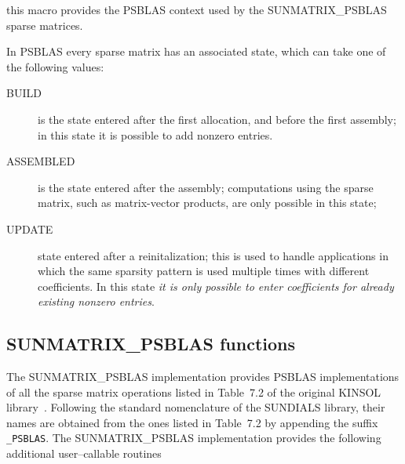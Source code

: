 \documentclass[twoside,a4paper]{refart}
\begin{document}
 this macro provides the PSBLAS context used by the SUNMATRIX\_PSBLAS sparse matrices.

In PSBLAS every sparse matrix has an associated state, which can take one of the following
values:
\begin{description}
\item[BUILD] is the state entered after the first allocation, and before the first assembly; in
this state it is possible to add nonzero entries.
\item[ASSEMBLED] is the state entered after the assembly; computations using the sparse
matrix, such as matrix-vector products, are only possible in this state;
\item[UPDATE] state entered after a reinitalization; this is used to handle applications
in which the same sparsity pattern is used multiple times with different
coefficients. \attention In this state \textit{it is only possible to enter coefficients for already
existing nonzero entries}.
\end{description}

\subsection{SUNMATRIX\_PSBLAS functions}

The SUNMATRIX\_PSBLAS implementation provides PSBLAS implementations of all the sparse matrix operations listed in Table~7.2 of the original KINSOL library~\cite{kinsolguide}. Following the standard nomenclature of the SUNDIALS library, their names are obtained from the ones listed in Table~7.2 by appending the suffix \texttt{\_PSBLAS}. The SUNMATRIX\_PSBLAS implementation provides the following additional user--callable routines
\end{document}
